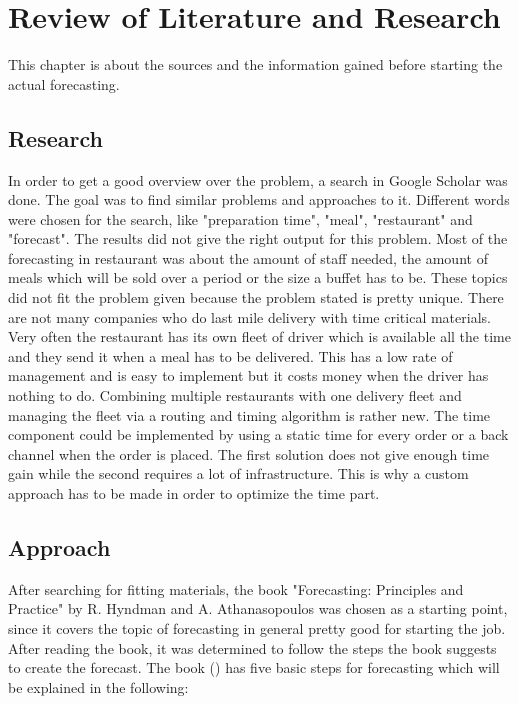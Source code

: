 \renewcommand{\thepage}{\arabic{page}}
\chapter{Review of Literature and Research}\label{chapter:Review of Literature and Research}
This chapter is about the sources and the information gained before starting the actual forecasting.
\section{Research}\label{section:Research}
In order to get a good overview over the problem, a search in Google Scholar was done. The goal was to find similar problems and approaches to it. Different words were chosen for the search, like "preparation time", "meal", "restaurant" and "forecast". The results did not give the right output for this problem. Most of the forecasting in restaurant was about the amount of staff needed, the amount of meals which will be sold over a period or the size a buffet has to
be. These topics did not fit the problem given because the problem stated is pretty unique. There are not many companies who do last mile delivery with time critical materials. Very often the restaurant has its own fleet of driver which is available all the time and they send it when a meal has to be delivered. This has a low rate of management and is easy to implement but it costs money when the driver has nothing to do. Combining multiple restaurants with one delivery fleet and managing the fleet via a routing and timing algorithm is rather new. The time component could be implemented by using a static time for every order or a back channel when the order is placed. The first solution does not give enough time gain while the second requires a lot of infrastructure. This is why a custom approach has to be made in order to optimize the time part.
\section{Approach}\label{section:Approach and Basics}
After searching for fitting materials, the book "Forecasting: Principles and Practice" by R. Hyndman and A. Athanasopoulos was chosen as a starting point, since it covers the topic of forecasting in general pretty good for starting the job. After reading the book, it was determined to follow the steps the book suggests to create the forecast. The book (\cite{Hyndman.2013}) has five basic steps for forecasting which will be explained in the following:

